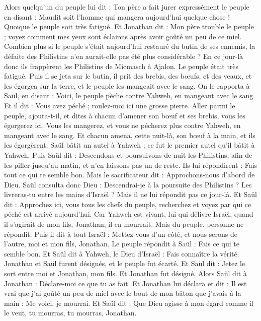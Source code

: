 \begin{multicols}{2}
Alors quelqu'un du peuple lui dit : Ton père a fait jurer expressément le peuple en disant : Maudit soit l'homme qui mangera aujourd'hui quelque chose ! Quoique le peuple soit très fatigué.
Et Jonathan dit : Mon père trouble le peuple ; voyez comment mes yeux sont éclaircis après avoir goûté un peu de ce miel.
Combien plus si le peuple s'était aujourd'hui restauré du butin de ses ennemis, la défaite des Philistins n'en aurait-elle pas été plus considérable ?
En ce jour-là donc ils frappèrent les Philistins de Micmasch à Ajalon. Le peuple était très fatigué.
Puis il se jeta sur le butin, il prit des brebis, des bœufs, et des veaux, et les égorgea sur la terre, et le peuple les mangeait avec le sang.
On le rapporta à Saül, en disant : Voici, le peuple pèche contre Yahweh, en mangeant avec le sang. Et il dit : Vous avez péché ; roulez-moi ici une grosse pierre.
Allez parmi le peuple, ajouta-t-il, et dites à chacun d'amener son bœuf et ses brebis, vous les égorgerez ici. Vous les mangerez, et vous ne pécherez plus contre Yahweh, en mangeant avec le sang. Et chacun amena, cette nuit-là, son bœuf à la main, et ils les égorgèrent.
Saül bâtit un autel à Yahweh ; ce fut le premier autel qu'il bâtit à Yahweh.
Puis Saül dit : Descendons et poursuivons de nuit les Philistins, afin de les piller jusqu'au matin, et n'en laissons pas un de reste. Ils lui répondirent : Fais tout ce qui te semble bon. Mais le sacrificateur dit : Approchons-nous d'abord de Dieu.
Saül consulta donc Dieu : Descendrai-je à la poursuite des Philistins ? Les livreras-tu entre les mains d'Israël ? Mais il ne lui répondit pas ce jour-là.
Et Saül dit : Approchez ici, vous tous les chefs du peuple, recherchez et voyez par qui ce péché est arrivé aujourd'hui.
Car Yahweh est vivant, lui qui délivre Israël, quand il s'agirait de mon fils, Jonathan, il en mourrait. Mais du peuple, personne ne répondit.
Puis il dit à tout Israël : Mettez-vous d'un côté, et nous serons de l'autre, moi et mon fils, Jonathan. Le peuple répondit à Saül : Fais ce qui te semble bon.
Et Saül dit à Yahweh, le Dieu d'Israël : Fais connaître la vérité. Jonathan et Saül furent désignés, et le peuple fut écarté.
Et Saül dit : Jetez le sort entre moi et Jonathan, mon fils. Et Jonathan fut désigné.
Alors Saül dit à Jonathan : Déclare-moi ce que tu as fait. Et Jonathan lui déclara et dit : Il est vrai que j'ai goûté un peu de miel avec le bout de mon bâton que j'avais à la main : Me voici, je mourrai.
Et Saül dit : Que Dieu agisse à mon égard comme il le veut, tu mourras, tu mourras, Jonathan.

\end{multicols}
